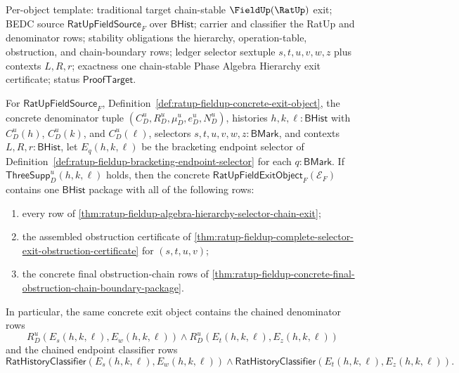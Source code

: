 Per-object template: traditional target chain-stable $\FieldUp(\RatUp)$ exit;
BEDC source $\mathsf{RatUpFieldSource}_F$ over $\mathsf{BHist}$; carrier and
classifier the RatUp and denominator rows; stability obligations the hierarchy,
operation-table, obstruction, and chain-boundary rows; ledger selector sextuple
$s,t,u,v,w,z$ plus contexts $L,R,r$; exactness one chain-stable Phase Algebra
Hierarchy exit certificate; status $\mathsf{ProofTarget}$.

\begin{theorem}
\label{thm:ratup-fieldup-concrete-algebra-hierarchy-obstruction-chain-exit-package}
For $\mathsf{RatUpFieldSource}_F$,
Definition~\ref{def:ratup-fieldup-concrete-exit-object}, the concrete
denominator tuple $(C_D^u,R_D^u,\mu_D^u,e_D^u,N_D^u)$, histories
$h,k,\ell:\mathsf{BHist}$ with $C_D^u(h)$, $C_D^u(k)$, and $C_D^u(\ell)$,
selectors $s,t,u,v,w,z:\mathsf{BMark}$, and contexts
$L,R,r:\mathsf{BHist}$, let $E_q(h,k,\ell)$ be the bracketing endpoint selector
of Definition~\ref{def:ratup-fieldup-bracketing-endpoint-selector} for each
$q:\mathsf{BMark}$. If $\mathsf{ThreeSupp}_D^u(h,k,\ell)$ holds, then the
concrete $\mathsf{RatUpFieldExitObject}_F(\mathcal E_F)$ contains one
$\mathsf{BHist}$ package with all of the following rows:
\begin{enumerate}
  \item every row of
  \autoref{thm:ratup-fieldup-algebra-hierarchy-selector-chain-exit};
  \item the assembled obstruction certificate of
  \autoref{thm:ratup-fieldup-complete-selector-exit-obstruction-certificate}
  for $(s,t,u,v)$;
  \item the concrete final obstruction-chain rows of
  \autoref{thm:ratup-fieldup-concrete-final-obstruction-chain-boundary-package}.
\end{enumerate}
In particular, the same concrete exit object contains the chained denominator
rows
$$
R_D^u(E_s(h,k,\ell),E_w(h,k,\ell))
\land
R_D^u(E_t(h,k,\ell),E_z(h,k,\ell))
$$
and the chained endpoint classifier rows
$$
\mathsf{RatHistoryClassifier}(E_s(h,k,\ell),E_w(h,k,\ell))
\land
\mathsf{RatHistoryClassifier}(E_t(h,k,\ell),E_z(h,k,\ell)).
$$
\end{theorem}
